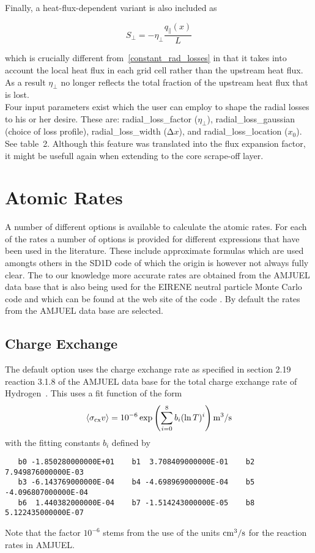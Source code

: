 \documentclass[amsmath,amssymb,a4]{revtex4-2}
\begin{document}
Finally, a heat-flux-dependent variant is also included as

\begin{equation}
S_{\perp}=-\eta_{\perp}\frac{q_\parallel(x)}{L}
\end{equation}

which is crucially different from~\ref{constant_rad_losses} in that it takes into account the local heat flux in each grid cell rather than the upstream heat flux. As a result $\eta_{\perp}$ no longer reflects the total fraction of the upstream heat flux that is lost.\\

Four input parameters exist which the user can employ to shape the radial losses to his or her desire. These are:
radial\_loss\_factor ($\eta_{\perp}$),
radial\_loss\_gaussian (choice of loss profile),
radial\_loss\_width ($\mathrm{\Delta}x$), and
radial\_loss\_location ($x_0$). See table~2. Although this feature was translated into the flux expansion factor, it might be usefull again when extending to the core scrape-off layer. 

\section{Atomic Rates}\label{rates}

A number of different options is available to calculate the atomic rates. For each of the rates a number of options is provided for different expressions that have been used in the literature. These include approximate formulas which are used amongts others in the SD1D code \cite{SD1D} of which the origin is however not always fully clear. The to our knowledge more accurate rates are obtained from the AMJUEL data base that is also being used for the EIRENE neutral particle Monte Carlo code and which can be found at the web site of the code \cite{EIRENE}. By default the rates from the AMJUEL data base are selected.


\subsection{Charge Exchange}

The default option uses the charge exchange rate as specified in section 2.19 reaction 3.1.8 of the AMJUEL data base for the total charge exchange rate of Hydrogen~\cite{EIRENE}. This uses a fit function of the form
\begin{equation}\label{charge_exchange_AMJUEL}
    \langle\sigma_{\rm cx} v\rangle = 10^{-6} \exp\left( \sum_{i=0}^8 b_i (\ln T)^i \right)  {\rm m}^3/{\rm s}
\end{equation}
with the fitting constants $b_i$ defined by
\begin{small}\begin{verbatim}
   b0 -1.850280000000E+01    b1  3.708409000000E-01    b2  7.949876000000E-03
   b3 -6.143769000000E-04    b4 -4.698969000000E-04    b5 -4.096807000000E-04
   b6  1.440382000000E-04    b7 -1.514243000000E-05    b8  5.122435000000E-07
\end{verbatim}\end{small}
Note that the factor $10^{-6}$ stems from the use of the units ${\rm cm}^3/{\rm s}$ for the reaction rates in AMJUEL.
\end{document}
